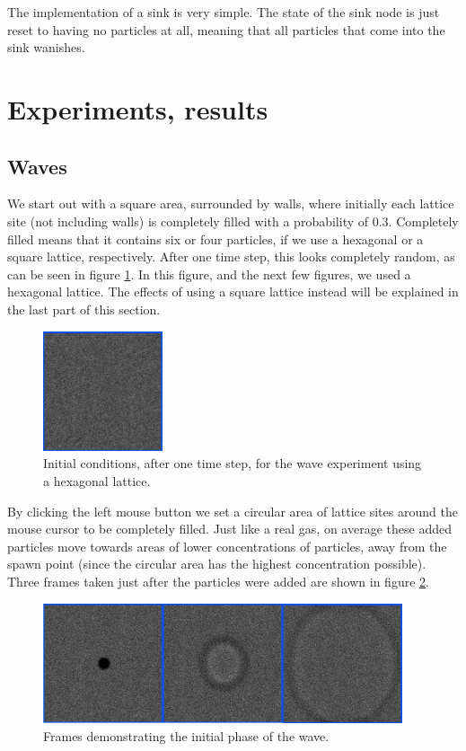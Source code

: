 \documentclass[12pt,a4paper]{article}
\begin{document}
The implementation of a sink is very simple. The state of the sink node is just reset
to having no particles at all, meaning that all particles that come into the sink 
wanishes. 


\section{Experiments, results}
\label{sec:exp}
\subsection{Waves}
We start out with a square area, surrounded by walls, where initially each lattice site (not including walls)
is completely filled with a probability of 0.3. Completely filled means that it contains six or
four particles, if we use a hexagonal or a square lattice, respectively. After one time step,
this looks completely random, as can be seen in figure \ref{hexwaveinit}. In this figure, and the
next few figures, we used a hexagonal lattice. The effects of using a square lattice instead will be
explained in the last part of this section.

\begin{figure}[htp]
\centering
  \includegraphics[width=100pt]{figs/hexwaveinit.png}
\caption{Initial conditions, after one time step, for the wave experiment using a hexagonal lattice.}
\label{hexwaveinit}
\end{figure}

By clicking the left mouse button we set a circular area of lattice sites around the mouse cursor to
be completely filled. Just like a real gas, on average these added particles move towards areas of lower
concentrations of particles, away from the spawn point (since the circular area has the highest concentration
possible). Three frames taken just after the particles were added are shown in figure \ref{hexwavestart}.

\begin{figure}[htp]
\centering
  \includegraphics[width=300pt]{figs/hexwavestart.png}
\caption{Frames demonstrating the initial phase of the wave.}
\label{hexwavestart}
\end{figure}
\end{document}
